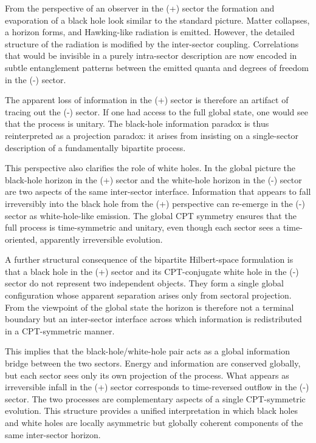 \documentclass[11pt,a4paper]{article}
\begin{document}
From the perspective of an observer in the (+) sector the formation and evaporation of a black hole look similar to the standard picture. Matter collapses, a horizon forms, and Hawking-like radiation is emitted. However, the detailed structure of the radiation is modified by the inter-sector coupling. Correlations that would be invisible in a purely intra-sector description are now encoded in subtle entanglement patterns between the emitted quanta and degrees of freedom in the (-) sector.

The apparent loss of information in the (+) sector is therefore an artifact of tracing out the (-) sector. If one had access to the full global state, one would see that the process is unitary. The black-hole information paradox is thus reinterpreted as a projection paradox: it arises from insisting on a single-sector description of a fundamentally bipartite process.

This perspective also clarifies the role of white holes. In the global picture the black-hole horizon in the (+) sector and the white-hole horizon in the (-) sector are two aspects of the same inter-sector interface. Information that appears to fall irreversibly into the black hole from the (+) perspective can re-emerge in the (-) sector as white-hole-like emission. The global CPT symmetry ensures that the full process is time-symmetric and unitary, even though each sector sees a time-oriented, apparently irreversible evolution.

\vspace{1.5em}

A further structural consequence of the bipartite Hilbert-space formulation is that a black hole in the (+) sector and its CPT-conjugate white hole in the (-) sector do not represent two independent objects. They form a single global configuration whose apparent separation arises only from sectoral projection. From the viewpoint of the global state the horizon is therefore not a terminal boundary but an inter-sector interface across which information is redistributed in a CPT-symmetric manner.

\vspace{1em}

This implies that the black-hole/white-hole pair acts as a global information bridge between the two sectors. Energy and information are conserved globally, but each sector sees only its own projection of the process. What appears as irreversible infall in the (+) sector corresponds to time-reversed outflow in the (-) sector. The two processes are complementary aspects of a single CPT-symmetric evolution. This structure provides a unified interpretation in which black holes and white holes are locally asymmetric but globally coherent components of the same inter-sector horizon.
\end{document}
